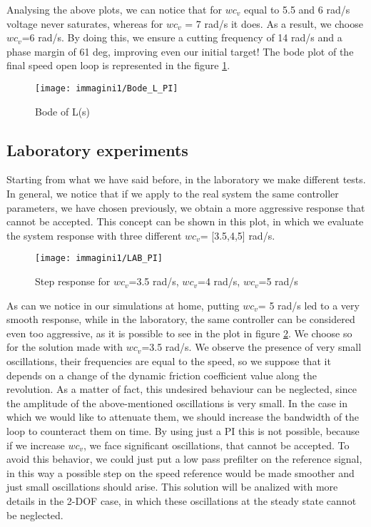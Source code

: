 \par
Analysing the above plots, we can notice that for $wc_{v} $ equal to 5.5 and 6 rad/s voltage never saturates, whereas for $wc_{v} $ = 7 rad/s it does. As a result, we choose $wc_{v} $=6 rad/s. 
By doing this, we ensure a cutting frequency of 14 rad/s and a phase margin of 61 deg, improving even our initial target!
The bode plot of the final speed open loop is represented in the figure \ref{fig:Bode_L_PI}.
\begin{figure}[h]
	\centering
	\texttt{[image: immagini1/Bode\_L\_PI]}
	\caption{Bode of L(s)}
	\label{fig:Bode_L_PI}
\end{figure}
\subsection{Laboratory experiments}
Starting from what we have said before, in the laboratory we make different tests. In general, we notice that if we apply to the real system the same controller parameters, we have chosen previously, we obtain a more aggressive response that cannot be accepted. This concept can be shown in this plot, in which we evaluate the system response with three different $wc_{v} $= [3.5,4,5] rad/s. 
\begin{figure}[h]
	\centering
	\texttt{[image: immagini1/LAB\_PI]}
	\caption{Step response for $wc_{v} $=3.5 rad/s, $wc_{v} $=4 rad/s, $wc_{v} $=5 rad/s }
	\label{fig:LAB_PI}
\end{figure}
As can we notice in our simulations at home, putting $wc_{v} $= 5 rad/s led to a very smooth response, while in the laboratory, the same controller can be considered even too aggressive, as it is possible to see in the plot in figure \ref{fig:LAB_PI}. We choose so for the solution made with $wc_{v} $=3.5 rad/s.
\newline
We observe the presence of very small oscillations, their frequencies are equal to the speed, so we suppose that it depends on a change of the dynamic friction coefficient value along the revolution. As a matter of fact, this undesired behaviour can be neglected, since the amplitude of the above-mentioned oscillations is very small.   In the case in which we would like to attenuate them, we should increase the bandwidth of the loop to counteract them on time. By using just a PI this is not possible, because if we increase $wc_{v} $, we face significant oscillations, that cannot be accepted. To avoid this behavior, we could just put a low pass prefilter on the reference signal, in this way a possible step on the speed reference would be made smoother and just small oscillations should arise. This solution will be analized with more details in the 2-DOF case, in which these oscillations at the steady state cannot be neglected.
